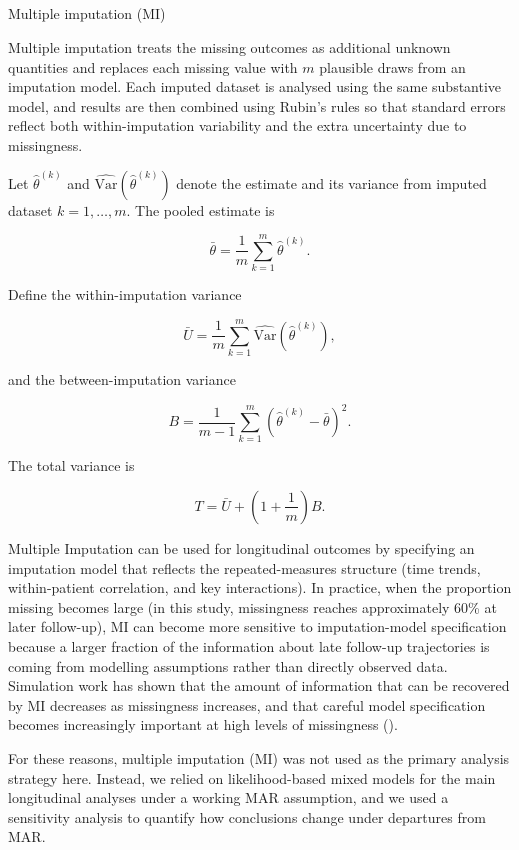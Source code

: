 \documentclass[
  9pt,
  letterpaper,
  DIV=11,
  numbers=noendperiod]{scrartcl}
\makeatletter
\let\oldsubparagraph\subparagraph
\renewcommand{\subparagraph}{
    \@ifstar
      \xxxSubParagraphStar
      \xxxSubParagraphNoStar
  }
\newcommand{\xxxSubParagraphStar}[1]{\oldsubparagraph*{#1}\mbox{}}
\newcommand{\xxxSubParagraphNoStar}[1]{\oldsubparagraph{#1}\mbox{}}
\makeatother
\begin{document}
\subparagraph{Multiple imputation (MI)}\label{multiple-imputation-mi}

Multiple imputation treats the missing outcomes as additional unknown
quantities and replaces each missing value with \(m\) plausible draws
from an imputation model. Each imputed dataset is analysed using the
same substantive model, and results are then combined using Rubin's
rules so that standard errors reflect both within-imputation variability
and the extra uncertainty due to missingness.

Let \(\hat\theta^{(k)}\) and
\(\widehat{\mathrm{Var}}(\hat\theta^{(k)})\) denote the estimate and its
variance from imputed dataset \(k=1,\dots,m\). The pooled estimate is

\[
\bar\theta = \frac{1}{m}\sum_{k=1}^m \hat\theta^{(k)}.
\]

Define the within-imputation variance

\[
\bar U = \frac{1}{m}\sum_{k=1}^m \widehat{\mathrm{Var}}(\hat\theta^{(k)}),
\]

and the between-imputation variance

\[
B = \frac{1}{m-1}\sum_{k=1}^m \left(\hat\theta^{(k)}-\bar\theta\right)^2.
\]

The total variance is

\[
T = \bar U + \left(1+\frac{1}{m}\right)B.
\]

Multiple Imputation can be used for longitudinal outcomes by specifying
an imputation model that reflects the repeated-measures structure (time
trends, within-patient correlation, and key interactions). In practice,
when the proportion missing becomes large (in this study, missingness
reaches approximately 60\% at later follow-up), MI can become more
sensitive to imputation-model specification because a larger fraction of
the information about late follow-up trajectories is coming from
modelling assumptions rather than directly observed data. Simulation
work has shown that the amount of information that can be recovered by
MI decreases as missingness increases, and that careful model
specification becomes increasingly important at high levels of
missingness ().

For these reasons, multiple imputation (MI) was not used as the primary
analysis strategy here. Instead, we relied on likelihood-based mixed
models for the main longitudinal analyses under a working MAR
assumption, and we used a sensitivity analysis to quantify how
conclusions change under departures from MAR.
\end{document}
